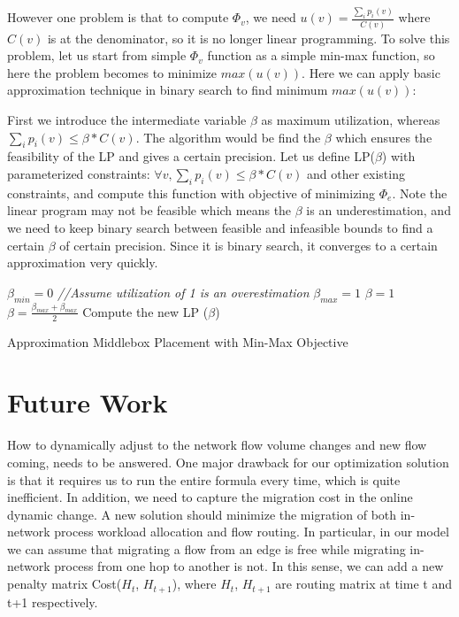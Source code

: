 \documentclass[twocolumn]{article}
\begin{document}
However one problem is that to compute $\Phi_v$, we need $u(v)= \frac{ \sum\limits_i p_i(v)}{C(v)}$ where $C(v)$ is at the denominator, so it is no longer linear programming. To solve this problem, let us start from simple $\Phi_v$ function as a simple min-max function, so here the problem becomes to minimize $max(u(v))$. Here we can apply basic approximation technique in binary search to find minimum $max(u(v))$: 

First we introduce the intermediate variable $\beta$ as maximum utilization, whereas $\sum\limits_i p_i(v) \leq \beta * C(v)$. The algorithm would be find the $\beta$ which ensures the feasibility of the LP and gives a certain precision. Let us define LP($\beta$) with parameterized constraints: $\forall v, \sum\limits_i p_i(v) \leq \beta * C(v)$ and other existing constraints, and compute this function with objective of minimizing $\Phi_e$. Note the linear program may not be feasible which means the $\beta$ is an underestimation, and we need to keep binary search between feasible and infeasible bounds to find a certain $\beta$ of certain precision. Since it is binary search, it converges to a certain approximation very quickly.

\begin{algorithm}\label {computeminmax}
\begin{framed}
$\beta_{min} = 0$\;
\emph{//Assume utilization of 1 is an overestimation}\;
$\beta_{max}=1$\; 
$\beta=1$\; 
{
$\beta = \frac{\beta_{max} + \beta_{max}}{2}$\;
Compute the new LP ($\beta$)\;
}
\caption{Approximation Middlebox Placement with Min-Max Objective}
\end{framed}
\end{algorithm}


\section{Future Work}
How to dynamically adjust to the network flow volume changes and new flow coming, needs to be answered. One major drawback for our optimization solution is that it requires us to run the entire formula every time, which is quite inefficient. In addition, we need to capture the migration cost in the online dynamic change. A new solution should minimize the migration of both in-network process workload allocation and flow routing. In particular, in our model we can assume that migrating a flow from an edge is free while migrating in-network process from one hop to another is not. In this sense, we can add a new penalty matrix Cost($H_t$, $H_{t+1}$), where $H_t$, $H_{t+1}$ are routing matrix at time t and t+1 respectively. 
\end{document}
